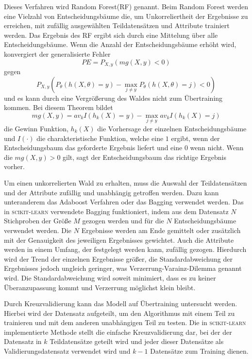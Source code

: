 Dieses Verfahren wird Random Forest(RF) genannt. Beim Random Forest werden eine Vielzahl von Entscheidungsbäume die, um Unkorreliertheit der Ergebnisse zu erreichen, mit
zufällig ausgewählten Teildatensätzen und Attribute trainiert werden. Das Ergebnis des RF ergibt sich durch eine Mittelung über alle Entscheidungsbäume.
Wenn die Anzahl der Entscheidungsbäume erhöht wird, konvergiert der generalisierte Fehler
\begin{equation}
  PE = P_{X,y}(mg(X,y)<0)
\end{equation}
gegen
\begin{equation}
  P_{X,y}(P_\theta(h(X,\theta)=y)-\max_{j\neq y}P_\theta(h(X,\theta)=j)<0)
\end{equation}
und es kann durch eine Vergrößerung des Waldes nicht zum Übertraining kommen\cite[7]{RandomForests_Breiman}. Bei diesem Theorem bildet
\begin{equation}
  mg(X,y) = av_k I(h_k(X)=y) - \max_{j \neq y}av_k I(h_k(X)=j)
\end{equation}
die Gewinn Funktion, $h_k(X)$ die Vorhersage der einzelnen Entscheidungsbäume und $I(\cdot)$ die charakteristische Funktion, welche eine $1$ ergibt, wenn der
Entscheidungsbaum das geforderte Ergebnis liefert und eine $0$ wenn nicht. Wenn die $mg(X,y) > 0$ gilt, sagt der Entscheidungsbaum das richtige Ergebnis vorher.

Um einen unkorrelierten Wald zu erhalten, muss die Auswahl der Teildatensätzen und der Attribute zufällig und unabhängig getroffen werden. Dazu kann unteranderem das Adaboost
Verfahren oder das Bagging verwendet werden. Das in \textsc{scikit-learn} verwendete Bagging funktioniert, indem aus dem Datensatz $N$ Stichproben der Größe
$M$ gezogen werden und für die $N$ Entscheidungsbäume verwendet werden. Die $N$ Ergebnisse werden am Ende gemittelt oder zusätzlich mit der Genauigkeit des jeweiligen Ergebnisses gewichtet.
Auch die Attribute werden in einem Umfang, der festgelegt werden kann, zufällig gezogen.
Hierdurch wird der Trend der einzelnen Ergebnisse größer, die Standardabweichung der Ergebnisses jedoch ungleich geringer,
was Verzerrung-Varainz-Dilemma genannt wird. Die Standardabweichung wird soweit minimiert, dass es zu keiner Überanzupassung kommt
und Verzerrung möglichst klein bleibt.

Durch Kreuzvalidierung kann das Modell auf Übertraining untersucht werden. Hierbei wird der Datensatz aufgeteilt, um
den Algorithmus mit einem Teil zu trainieren und mit dem anderen unabhängigen Teil zu testen.
Die in \textsc{scikit-learn} implementierte Methode stellt die einfache Kreuzvalidierung dar, bei der der Datensatz
in $k$ Teildatensätze geteilt wird und jeder dieser Datensätze als Validierungsdatensatz
verwendet wird und $k-1$ Datensätze zum Training dienen.

